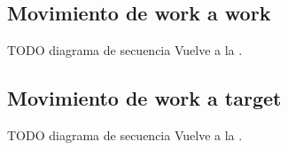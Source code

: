 \newpage{}
\subsection{Movimiento de work a work}
TODO diagrama de secuencia
Vuelve a la .

\newpage{}
\subsection{Movimiento de work a target}
TODO diagrama de secuencia
Vuelve a la .
